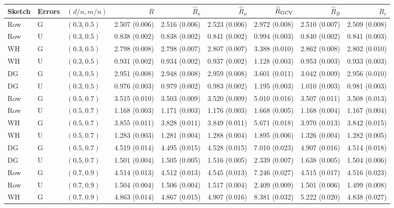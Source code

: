 \begin{tabular}{@{}lllrrrrrr@{}}
\toprule
Sketch & Errors & $(d/n,m/n)$ & $R$ & $\widehat R_o$ & $\widehat R_u$ & $\widehat R_{\rm GCV}$ & $\widehat R_B$ & $\widehat R_c$ \\
\midrule
Row & G & $(0.3,0.5)$ & 2.507 (0.006) & 2.516 (0.006) & 2.523 (0.006) & 2.972 (0.008) & 2.510 (0.007) & 2.509 (0.008) \\
Row & U & $(0.3,0.5)$ & 0.838 (0.002) & 0.838 (0.002) & 0.841 (0.002) & 0.994 (0.003) & 0.840 (0.002) & 0.841 (0.003) \\
WH & G & $(0.3,0.5)$ & 2.798 (0.008) & 2.798 (0.007) & 2.807 (0.007) & 3.388 (0.010) & 2.862 (0.008) & 2.802 (0.010) \\
WH & U & $(0.3,0.5)$ & 0.931 (0.002) & 0.934 (0.002) & 0.937 (0.002) & 1.128 (0.003) & 0.953 (0.003) & 0.933 (0.003) \\
DG & G & $(0.3,0.5)$ & 2.951 (0.008) & 2.948 (0.008) & 2.959 (0.008) & 3.601 (0.011) & 3.042 (0.009) & 2.956 (0.010) \\
DG & U & $(0.3,0.5)$ & 0.976 (0.003) & 0.979 (0.002) & 0.983 (0.002) & 1.195 (0.003) & 1.010 (0.003) & 0.981 (0.003) \\
\midrule
Row & G & $(0.5,0.7)$ & 3.515 (0.010) & 3.503 (0.009) & 3.520 (0.009) & 5.010 (0.016) & 3.507 (0.011) & 3.508 (0.013) \\
Row & U & $(0.5,0.7)$ & 1.168 (0.003) & 1.171 (0.003) & 1.176 (0.003) & 1.668 (0.005) & 1.168 (0.004) & 1.167 (0.004) \\
WH & G & $(0.5,0.7)$ & 3.855 (0.011) & 3.828 (0.011) & 3.849 (0.011) & 5.671 (0.018) & 3.970 (0.013) & 3.842 (0.015) \\
WH & U & $(0.5,0.7)$ & 1.283 (0.003) & 1.281 (0.004) & 1.288 (0.004) & 1.895 (0.006) & 1.326 (0.004) & 1.282 (0.005) \\
DG & G & $(0.5,0.7)$ & 4.519 (0.014) & 4.495 (0.015) & 4.528 (0.015) & 7.010 (0.023) & 4.907 (0.016) & 4.514 (0.018) \\
DG & U & $(0.5,0.7)$ & 1.501 (0.004) & 1.505 (0.005) & 1.516 (0.005) & 2.339 (0.007) & 1.638 (0.005) & 1.504 (0.006) \\
\midrule
Row & G & $(0.7,0.9)$ & 4.514 (0.013) & 4.512 (0.013) & 4.545 (0.013) & 7.246 (0.027) & 4.515 (0.017) & 4.516 (0.023) \\
Row & U & $(0.7,0.9)$ & 1.504 (0.004) & 1.506 (0.004) & 1.517 (0.004) & 2.409 (0.009) & 1.501 (0.006) & 1.499 (0.008) \\
WH & G & $(0.7,0.9)$ & 4.863 (0.014) & 4.867 (0.015) & 4.907 (0.016) & 8.381 (0.032) & 5.222 (0.020) & 4.838 (0.027) \\

\end{tabular}

